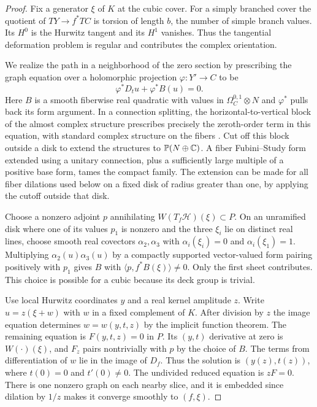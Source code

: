 \begin{proof}
Fix a generator $\xi$ of $K$ at the cubic cover. For a simply
branched cover the quotient of $TY\to f^*TC$ is torsion of length
$b$, the number of simple branch values. Its $H^0$ is the Hurwitz
tangent and its $H^1$ vanishes. Thus the tangential deformation
problem is regular and contributes the complex orientation.

We realize the path in a neighborhood of the zero section by
prescribing the graph equation over a holomorphic projection
$\varphi:Y'\to C$ to be
\begin{equation}\label{p10-eq:cubic-graphequation}
 \varphi^*D_t u+\varphi^*B(u)=0 .
\end{equation}
Here $B$ is a smooth fiberwise real quadratic with values in
$\Omega^{0,1}_C\otimes N$ and $\varphi^*$ pulls back its form argument.
In a connection splitting, the horizontal-to-vertical block of the
almost complex structure prescribes precisely the zeroth-order term
in this equation, with standard complex structure on the fibers
\cite[Lemma~5.9]{bai}.
Cut off this block outside a disk to extend the structures to
$\mathbb P(N\oplus\mathbb C)$. A fiber Fubini--Study form extended using a
unitary connection, plus a sufficiently large multiple of a positive
base form, tames the compact family. The extension can be made for
all fiber dilations used below on a fixed disk of radius greater than
one, by applying the cutoff outside that disk.

Choose a nonzero adjoint $p$ annihilating
$W(T_f\mathcal H)(\xi)\subset P$. On an unramified disk where one
of its values $p_1$ is nonzero and the three $\xi_i$ lie on
distinct real lines, choose smooth real covectors $\alpha_2,\alpha_3$
with $\alpha_i(\xi_i)=0$ and $\alpha_i(\xi_1)=1$. Multiplying
$\alpha_2(u)\alpha_3(u)$ by a compactly supported vector-valued
form pairing positively with $p_1$ gives $B$ with
$\langle p,f^*B(\xi)\rangle\ne0$. Only the first sheet contributes.
This choice is possible for a cubic because its deck group is trivial.

Use local Hurwitz coordinates $y$ and a real kernel amplitude $z$.
Write $u=z(\xi+w)$ with $w$ in a fixed complement of $K$. After
division by $z$ the image equation determines $w=w(y,t,z)$ by the
implicit function theorem. The remaining equation is $F(y,t,z)=0$
in $P$. Its $(y,t)$ derivative at zero is $W(\cdot)(\xi)$, and
$F_z$ pairs nontrivially with $p$ by the choice of $B$. The terms
from differentiation of $w$ lie in the image of $D_f$. Thus the
solution is $(y(z),t(z))$, where $t(0)=0$ and $t'(0)\ne0$. The
undivided reduced equation is $zF=0$. There is one nonzero graph
on each nearby slice, and it is embedded since dilation by $1/z$
makes it converge smoothly to $(f,\xi)$.


\end{proof}

